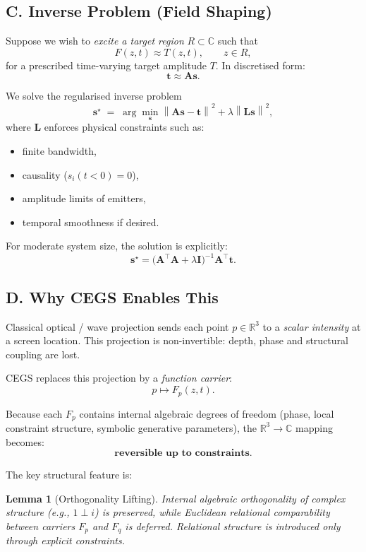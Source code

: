 \documentclass[11pt]{article}
\theoremstyle{plain}
\newtheorem{lemma}{Lemma}[section]
\theoremstyle{definition}
\theoremstyle{remark}
\begin{document}
\subsection*{C. Inverse Problem (Field Shaping)}
Suppose we wish to \emph{excite a target region} \(R \subset \mathbb{C}\) such that
\[
F(z,t) \approx T(z,t), \qquad z \in R,
\]
for a prescribed time-varying target amplitude \(T\).
In discretised form:
\[
\mathbf{t} \approx \mathbf{A}\mathbf{s}.
\]

We solve the regularised inverse problem
\[
\mathbf{s}^\star
\;=\;
\arg\min_{\mathbf{s}}
\left\| \mathbf{A}\mathbf{s} - \mathbf{t} \right\|^2
+ \lambda \left\| \mathbf{L}\mathbf{s} \right\|^2,
\]
where \(\mathbf{L}\) enforces physical constraints such as:
\begin{itemize}[leftmargin=*]
\item finite bandwidth,
\item causality (\(s_i(t<0)=0\)),
\item amplitude limits of emitters,
\item temporal smoothness if desired.
\end{itemize}

For moderate system size, the solution is explicitly:
\[
\mathbf{s}^\star
=
\big(\mathbf{A}^\top \mathbf{A} + \lambda \mathbf{I}\big)^{-1}
\mathbf{A}^\top \mathbf{t}.
\]

\subsection*{D. Why CEGS Enables This}
Classical optical / wave projection sends each point \(p\in\mathbb{R}^3\) to a \emph{scalar intensity}
at a screen location. This projection is non-invertible: depth, phase and structural coupling are lost.

CEGS replaces this projection by a \emph{function carrier}:
\[
p \mapsto F_p(z,t).
\]

Because each \(F_p\) contains internal algebraic degrees of freedom (phase, local constraint
structure, symbolic generative parameters), the \(\mathbb{R}^3 \to \mathbb{C}\) mapping becomes:
\[
\textbf{reversible up to constraints.}
\]

The key structural feature is:

\begin{lemma}[Orthogonality Lifting]
Internal algebraic orthogonality of complex structure (e.g., \(1 \perp i\)) is preserved,
while Euclidean relational comparability between carriers \(F_p\) and \(F_q\) is deferred.
Relational structure is introduced only through explicit constraints.
\end{lemma}
\end{document}
